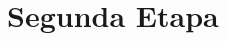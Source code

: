 \documentclass[11pt]{article}
\begin{document}
\newpage

\section*{Segunda Etapa}


\begin{figure}[H]
    
\end{figure}




\end{document}
